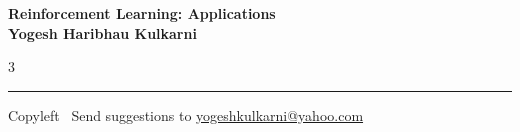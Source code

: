 \documentclass[8pt,landscape]{article}
\begin{document}
\footnotesize


\begin{center}
\Large{\textbf{Reinforcement Learning: Applications\\ Yogesh Haribhau Kulkarni}}
\end{center}

\begin{multicols}{3}

\end{multicols}

\rule{\linewidth}{0.25pt}
\scriptsize
Copyleft \textcopyleft\  Send suggestions to
\href{http://www.yogeshkulkarni.com}{yogeshkulkarni@yahoo.com}
\end{document}
